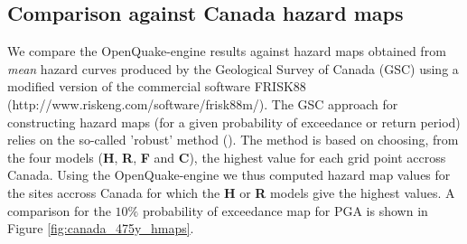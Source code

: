 \subsection{Comparison against Canada hazard maps}
We compare the OpenQuake-engine results against hazard maps obtained from \textit{mean} hazard curves produced by the Geological Survey of Canada (GSC) using a modified version of the commercial software FRISK88 (http://www.riskeng.com/software/frisk88m/). The GSC approach for constructing hazard maps (for a given probability of exceedance or return period) relies on the so-called 'robust' method (\cite{adams2003}). The method is based on choosing, from the four models (\textbf{H}, \textbf{R}, \textbf{F} and \textbf{C}), the highest value for each grid point accross Canada. Using the OpenQuake-engine we thus computed hazard map values for the sites accross Canada for which the \textbf{H} or \textbf{R} models give the highest values. A comparison for the $10\%$ probability of exceedance map for PGA is shown in Figure \ref{fig:canada_475y_hmaps}.
